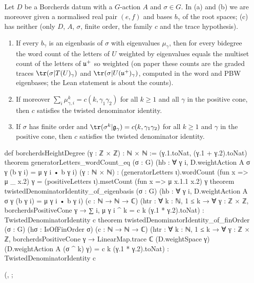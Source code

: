 \begin{theorem}\label{ch19:thm:twistedabstract}
Let $D$ be a Borcherds datum with a $G$-action $A$ and $\sigma\in G$.  In (a) and (b) we are moreover given a normalised real pair
$(e,f)$ and bases $b_\gamma$ of the root spaces; (c) has neither (only $D$, $A$, $\sigma$, finite order, the family $c$ and the trace
hypothesis).
\begin{enumerate}[label=(\alph*)]
\item If every $b_\gamma$ is an eigenbasis of $\sigma$ with eigenvalues $\mu_\gamma$, then for every bidegree the word count of
  the letters of $U$ weighted by eigenvalues equals the multiset count of the letters of $\mathfrak{u}^+$ so weighted (on paper these counts are the graded traces
  $\tr(\sigma|T(U)_\gamma)$ and $\tr(\sigma|U(\chnineteenu^+)_\gamma)$, computed in the word and PBW eigenbases; the Lean statement is about the
  counts).
\item If moreover $\sum_i\mu_{\gamma,i}^k=c(k,\gamma_1\gamma_2)$ for all $k\ge1$ and all $\gamma$ in the positive cone, then $c$
  satisfies the twisted denominator identity.
\item If $\sigma$ has finite order and $\tr(\sigma^k|\mathfrak g_\gamma)=c(k,\gamma_1\gamma_2)$ for all $k\ge1$ and $\gamma$ in the positive
  cone, then $c$ satisfies the twisted denominator identity.
\end{enumerate}
\end{theorem}
\begin{leancode}
def borcherdsHeightDegree (γ : ℤ × ℤ) : ℕ × ℕ := (γ.1.toNat, (γ.1 + γ.2).toNat)
theorem generatorLetters_wordCount_eq (σ : G)
    (hb : ∀ γ i, D.weightAction A σ γ (b γ i) = μ γ i • b γ i) (γ : ℕ × ℕ) :
    (generatorLetters ι).wordCount (fun x => μ _ x.2) γ =
      (positiveLetters ι).msetCount (fun x => μ x.1.1 x.2) γ
theorem twistedDenominatorIdentity_of_eigenbasis (σ : G)
    (hb : ∀ γ i, D.weightAction A σ γ (b γ i) = μ γ i • b γ i) (c : ℕ → ℕ → ℂ)
    (htr : ∀ k : ℕ, 1 ≤ k → ∀ γ : ℤ × ℤ, borcherdsPositiveCone γ →
      ∑ i, μ γ i ^ k = c k (γ.1 * γ.2).toNat) :
    TwistedDenominatorIdentity c
theorem twistedDenominatorIdentity_of_finOrder (σ : G) (hσ : IsOfFinOrder σ) (c : ℕ → ℕ → ℂ)
    (htr : ∀ k : ℕ, 1 ≤ k → ∀ γ : ℤ × ℤ, borcherdsPositiveCone γ →
      LinearMap.trace ℂ (D.weightSpace γ) (D.weightAction A (σ ^ k) γ) =
        c k (γ.1 * γ.2).toNat) :
    TwistedDenominatorIdentity c
\end{leancode}
(, ;
